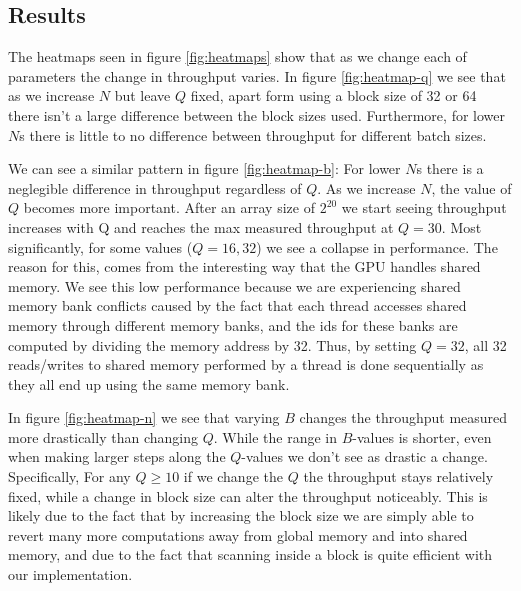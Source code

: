 \documentclass[twocolumn]{article}
\begin{document}
\subsection{Results}
\label{sec:results}
The heatmaps seen in figure \ref{fig:heatmaps} show that as we change each of parameters the change in throughput varies. In figure \ref{fig:heatmap-q} we see that as we increase $N$ but leave $Q$ fixed, apart form using a block size of 32 or 64 there isn't a large difference between the block sizes used. Furthermore, for lower $N$s there is little to no difference between throughput for different batch sizes.

We can see a similar pattern in figure \ref{fig:heatmap-b}: For lower $N$s there is a neglegible difference in throughput regardless of $Q$. As we increase $N$, the value of $Q$ becomes more important. After an array size of $2^{20}$ we start seeing throughput increases with Q and reaches the max measured throughput at $Q=30$. Most significantly, for some values ($Q=16,32$) we see a collapse in performance. The reason for this, comes from the interesting way that the GPU handles shared memory. We see this low performance because we are experiencing shared memory bank conflicts caused by the fact that each thread accesses shared memory through different memory banks, and the ids for these banks are computed by dividing the memory address by 32. Thus, by setting $Q=32$, all 32 reads/writes to shared memory performed by a thread is done sequentially as they all end up using the same memory bank.

In figure \ref{fig:heatmap-n} we see that varying $B$ changes the throughput measured more drastically than changing $Q$. While the range in $B$-values is shorter, even when making larger steps along the $Q$-values we don't see as drastic a change. Specifically, For any $Q\geq 10$ if we change the $Q$ the throughput stays relatively fixed, while a change in block size can alter the throughput noticeably. This is likely due to the fact that by increasing the block size we are simply able to revert many more computations away from global memory and into shared memory, and due to the fact that scanning inside a block is quite efficient with our implementation.
\end{document}
